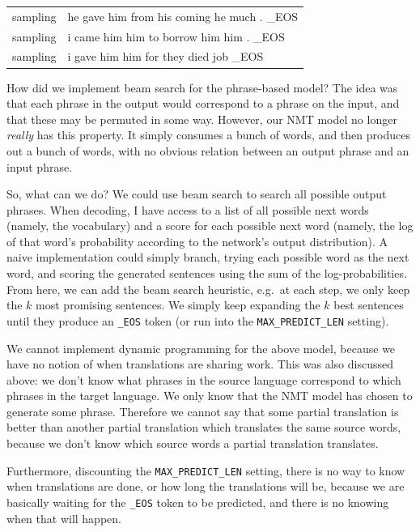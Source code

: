 \documentclass[answers]{exam}
\begin{document}
\begin{CJK}{UTF8}{min}
\begin{questions}
\begin{framed}
\begin{compactenum}[1.]
  \begin{tabular}{ll}
    sampling & he gave him from his coming he much . \_EOS\\
    sampling & i came him him to borrow him him . \_EOS\\
    sampling & i gave him him for they died job \_EOS
  \end{tabular}
  \item
    How did we implement beam search for the phrase-based model? The idea was
    that each phrase in the output would correspond to a phrase on the input,
    and that these may be permuted in some way.
    However, our NMT model no longer \emph{really} has this property. It simply
    consumes a bunch of words, and then produces out a bunch of words, with no
    obvious relation between an output phrase and an input phrase.

    So, what can we do? We could use beam search to search all possible
    output phrases. When decoding, I have access to a list of all possible next
    words (namely, the vocabulary) and a score for each possible next word
    (namely, the log of that word's probability according to the network's
    output distribution). A naive implementation could simply branch, trying
    each possible word as the next word, and scoring the generated sentences
    using the sum of the log-probabilities.
    From here, we can add the beam search heuristic, e.g.\ at each step, we only
    keep the $k$ most promising sentences. We simply keep expanding the $k$ best
    sentences until they produce an \texttt{\_EOS} token (or run into the
    \texttt{MAX\_PREDICT\_LEN} setting).
  \item
    We cannot implement dynamic programming for the above model, because we have
    no notion of when translations are sharing work. This was also discussed
    above: we don't know what phrases in the source language correspond to which
    phrases in the target language. We only know that the NMT model has chosen
    to generate some phrase. Therefore we cannot say that some partial
    translation is better than another partial translation which translates the
    same source words, because we don't know which source words a partial
    translation translates. 
    
    Furthermore, discounting the \texttt{MAX\_PREDICT\_LEN} setting, there is no
    way to know when translations are done, or how long the translations will
    be, because we are basically waiting for the \texttt{\_EOS} token to be
    predicted, and there is no knowing when that will happen. 
\end{compactenum}
\end{framed}



\end{questions}
\end{CJK}
\end{document}
